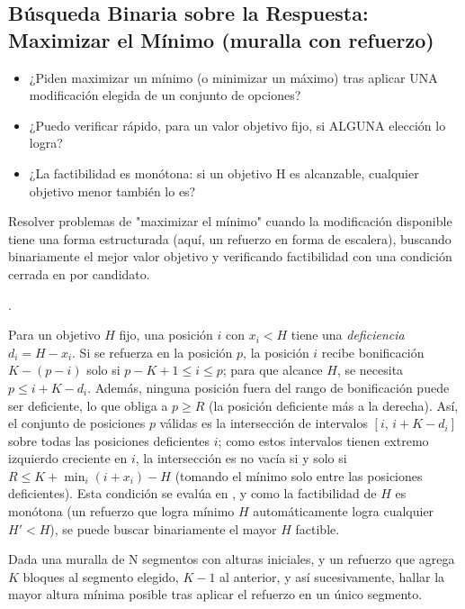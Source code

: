 \subsection{Búsqueda Binaria sobre la Respuesta: Maximizar el Mínimo (muralla con refuerzo)}
\label{alg:5-3}


\begin{itemize}
\item ¿Piden maximizar un mínimo (o minimizar un máximo) tras aplicar UNA modificación elegida de un conjunto de opciones?
\item ¿Puedo verificar rápido, para un valor objetivo fijo, si ALGUNA elección lo logra?
\item ¿La factibilidad es monótona: si un objetivo H es alcanzable, cualquier objetivo menor también lo es?
\end{itemize}

 Resolver problemas de "maximizar el mínimo" cuando la modificación disponible tiene una forma estructurada (aquí, un refuerzo en forma de escalera), buscando binariamente el mejor valor objetivo y verificando factibilidad con una condición cerrada en  por candidato.

 .

 Para un objetivo $H$ fijo, una posición $i$ con $x_i < H$ tiene una \emph{deficiencia} $d_i = H - x_i$. Si se refuerza en la posición $p$, la posición $i$ recibe bonificación $K-(p-i)$ solo si $p-K+1 \le i \le p$; para que alcance $H$, se necesita $p \le i + K - d_i$. Además, ninguna posición fuera del rango de bonificación puede ser deficiente, lo que obliga a $p \ge R$ (la posición deficiente más a la derecha). Así, el conjunto de posiciones $p$ válidas es la intersección de intervalos $[i,\, i+K-d_i]$ sobre todas las posiciones deficientes $i$; como estos intervalos tienen extremo izquierdo creciente en $i$, la intersección es no vacía si y solo si $R \le K + \min_i(i + x_i) - H$ (tomando el mínimo solo entre las posiciones deficientes). Esta condición se evalúa en , y como la factibilidad de $H$ es monótona (un refuerzo que logra mínimo $H$ automáticamente logra cualquier $H' < H$), se puede buscar binariamente el mayor $H$ factible.


Dada una muralla de N segmentos con alturas iniciales, y un refuerzo que agrega $K$ bloques al segmento elegido, $K-1$ al anterior, y así sucesivamente, hallar la mayor altura mínima posible tras aplicar el refuerzo en un único segmento.

